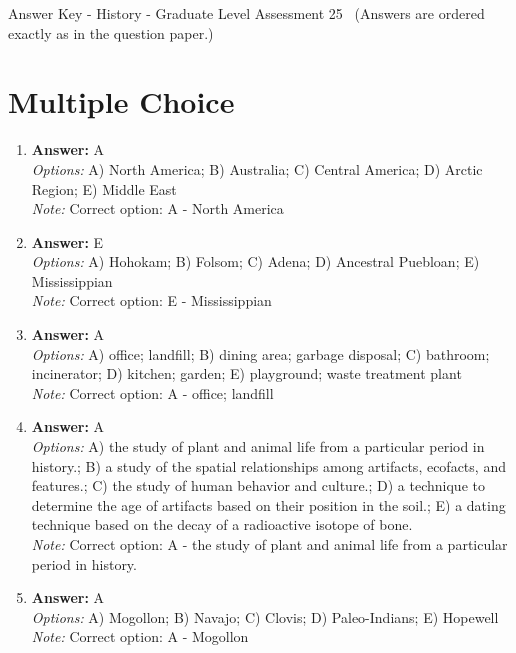 \documentclass[12pt]{article}
\begin{document}
\begin{center}
Answer Key - History - Graduate Level Assessment 25 \
\small (Answers are ordered exactly as in the question paper.)
\end{center}

\section*{Multiple Choice}
\begin{enumerate}[label=\arabic*.]
\item \textbf{Answer:} A
\\ \textit{Options:} A) North America; B) Australia; C) Central America; D) Arctic Region; E) Middle East
\\ \textit{Note:} Correct option: A - North America
\item \textbf{Answer:} E
\\ \textit{Options:} A) Hohokam; B) Folsom; C) Adena; D) Ancestral Puebloan; E) Mississippian
\\ \textit{Note:} Correct option: E - Mississippian
\item \textbf{Answer:} A
\\ \textit{Options:} A) office; landfill; B) dining area; garbage disposal; C) bathroom; incinerator; D) kitchen; garden; E) playground; waste treatment plant
\\ \textit{Note:} Correct option: A - office; landfill
\item \textbf{Answer:} A
\\ \textit{Options:} A) the study of plant and animal life from a particular period in history.; B) a study of the spatial relationships among artifacts, ecofacts, and features.; C) the study of human behavior and culture.; D) a technique to determine the age of artifacts based on their position in the soil.; E) a dating technique based on the decay of a radioactive isotope of bone.
\\ \textit{Note:} Correct option: A - the study of plant and animal life from a particular period in history.
\item \textbf{Answer:} A
\\ \textit{Options:} A) Mogollon; B) Navajo; C) Clovis; D) Paleo-Indians; E) Hopewell
\\ \textit{Note:} Correct option: A - Mogollon
\end{enumerate}
\end{document}

